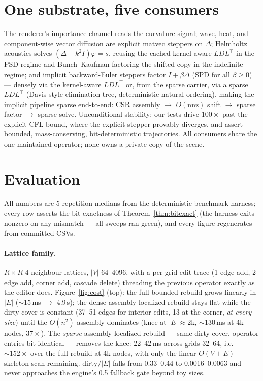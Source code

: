 \section{One substrate, five consumers}\label{sec:substrate}

The renderer's importance channel reads the curvature signal; wave, heat,
and component-wise vector diffusion are explicit matvec steppers on
$\Delta$; Helmholtz acoustics solves $(\Delta - k^2 I)\varphi = s$, reusing
the cached kernel-aware $LDL^\top$ in the PSD regime and Bunch--Kaufman
factoring the shifted copy in the indefinite regime; and implicit
backward-Euler steppers factor $I + \beta\Delta$ (SPD for all
$\beta \ge 0$) --- densely via the kernel-aware $LDL^\top$ or, from the
sparse carrier, via a sparse $LDL^\top$ (Davis-style elimination tree,
deterministic natural ordering), making the implicit pipeline sparse
end-to-end: CSR assembly $\to$ $O(\mathrm{nnz})$ shift $\to$ sparse factor
$\to$ sparse solve. Unconditional stability: our tests drive $100\times$
past the explicit CFL bound, where the explicit stepper provably diverges,
and assert bounded, mass-conserving, bit-deterministic trajectories. All
consumers share the one maintained operator; none owns a private copy of
the scene.

\section{Evaluation}\label{sec:eval}

All numbers are 5-repetition medians from the deterministic benchmark
harness; every row asserts the bit-exactness of Theorem~\ref{thm:bitexact}
(the harness exits nonzero on any mismatch --- all sweeps ran green), and
every figure regenerates from committed CSVs.

\paragraph*{Lattice family.}
$R \times R$ 4-neighbour lattices, $|V|$ 64--4096, with a per-grid edit
trace (1-edge add, 2-edge add, corner add, cascade delete) threading the
previous operator exactly as the editor does.
Figure~\ref{fig:cost} (top): the full bounded rebuild grows linearly in
$|E|$ (${\sim}15$\,ms $\to$ 4.9\,s); the dense-assembly localized rebuild
stays flat while the dirty cover is constant (37--51 edges for interior
edits, 13 at the corner, \emph{at every size}) until the $O(n^2)$ assembly
dominates (knee at ${|E| \approx 2}$k, ${\sim}130$\,ms at 4k nodes,
$37\times$). The \emph{sparse}-assembly localized rebuild --- same dirty
cover, operator entries bit-identical --- removes the knee: 22--42\,ms
across grids 32--64, i.e.\ ${\sim}152\times$ over the full rebuild at 4k
nodes, with only the linear $O(V{+}E)$ skeleton scan remaining.
$\mathrm{dirty}/|E|$ falls from 0.33--0.44 to 0.0016--0.0063 and never
approaches the engine's 0.5 fallback gate beyond toy sizes.

